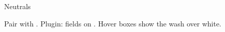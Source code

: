 \begin{standardframe}{Neutrals}

\medskip\par Pair  with . Plugin: fields on . Hover boxes show the wash over white.
\end{standardframe}
